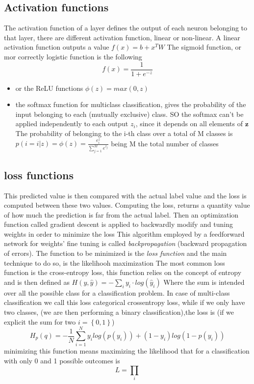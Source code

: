 \documentclass[a4paper,11pt]{article}
\begin{document}
\subsection{Activation functions}
The activation function of a layer defines the output of each neuron belonging to that layer, there are different activation function, linear or non-linear.
A linear activation function outputs a value $f(x) = b+x^T W$
The sigmoid function, or mor correctly logistic function is the following
\begin{equation}
f(x) = \frac{1}{1+e^{-z}}
\end{equation}

\begin{itemize}
\item or the ReLU functions $\phi(z) = max(0, z)$
\item the softmax function for multiclass classification, gives the probability of the input belonging to each (mutually exclusive) class. SO the softmax can't be applied independently to each output $z_i$, since it depends on all elements of $\textbf{z}$ The probability of belonging to the i-th class over a total of M classes is
$p(i = i|z) = \phi(z) = \frac{e^z_i}{\sum_{j = 1}^M e^{z_j}}$ being M the total number of classes
\end{itemize}


\subsection{loss functions}
This predicted value is then compared with the actual label value and the loss is computed between these two values.
Computing the loss, returns a quantity value of how much the prediction is far from the actual label.
Then an optimization function called gradient descent is applied to backwardly modify and tuning weights in order to minimize the loss
This algorithm employed by a feedforward network for weights' fine tuning is called \emph{backpropagation} (backward propagation of errors).
The function to be minimized is the \emph{loss function} and the main technique to do so, is the likelihooh maximization
The most common loss function is the cross-entropy loss, this function relies on the concept of entropy and is then defined as
$H(y, \hat y) = -\sum_i y_i \cdot log(\hat y_i)$
Where the sum is intended over all the possible class for a classification problem. In case of multi-class classification we call this loss categorical crossentropy loss, while if we only have two classes, (we are then performing a binary classification),the loss is (if we explicit the sum for two $i = \left\{0, 1\right\}$)
\begin{equation}
H_p(q) = -\frac{1}{N} \sum_{i= 1}^N y_i log(p(y_i)) + (1-y_i)log(1-p(y_i))
\end{equation}
minimizing this function means maximizing the likelihood that for a classification with only 0 and 1 possible outcomes is
\begin{equation}
L = \prod_i
\end{equation}
\end{document}
